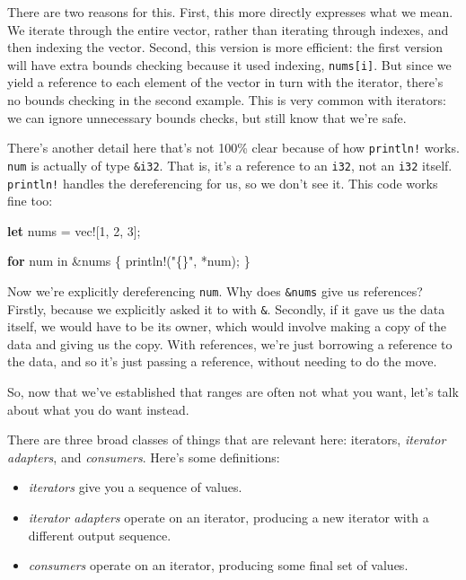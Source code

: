 \documentclass[a4paper,]{book}
\newenvironment{Shaded}{\begin{snugshade}}{\end{snugshade}}
\newcommand{\KeywordTok}[1]{\textcolor[rgb]{0.13,0.29,0.53}{\textbf{{#1}}}}
\newcommand{\DecValTok}[1]{\textcolor[rgb]{0.00,0.00,0.81}{{#1}}}
\newcommand{\StringTok}[1]{\textcolor[rgb]{0.31,0.60,0.02}{{#1}}}
\newcommand{\OtherTok}[1]{\textcolor[rgb]{0.56,0.35,0.01}{{#1}}}
\newcommand{\NormalTok}[1]{{#1}}
\begin{document}
There are two reasons for this. First, this more directly expresses what
we mean. We iterate through the entire vector, rather than iterating
through indexes, and then indexing the vector. Second, this version is
more efficient: the first version will have extra bounds checking
because it used indexing, \texttt{nums{[}i{]}}. But since we yield a
reference to each element of the vector in turn with the iterator,
there's no bounds checking in the second example. This is very common
with iterators: we can ignore unnecessary bounds checks, but still know
that we're safe.

There's another detail here that's not 100\% clear because of how
\texttt{println!} works. \texttt{num} is actually of type
\texttt{\&i32}. That is, it's a reference to an \texttt{i32}, not an
\texttt{i32} itself. \texttt{println!} handles the dereferencing for us,
so we don't see it. This code works fine too:

\begin{Shaded}
\begin{Highlighting}[]
\KeywordTok{let} \NormalTok{nums = }\OtherTok{vec!}\NormalTok{[}\DecValTok{1}\NormalTok{, }\DecValTok{2}\NormalTok{, }\DecValTok{3}\NormalTok{];}

\KeywordTok{for} \NormalTok{num in &nums \{}
    \OtherTok{println!}\NormalTok{(}\StringTok{"\{\}"}\NormalTok{, *num);}
\NormalTok{\}}
\end{Highlighting}
\end{Shaded}

Now we're explicitly dereferencing \texttt{num}. Why does
\texttt{\&nums} give us references? Firstly, because we explicitly asked
it to with \texttt{\&}. Secondly, if it gave us the data itself, we
would have to be its owner, which would involve making a copy of the
data and giving us the copy. With references, we're just borrowing a
reference to the data, and so it's just passing a reference, without
needing to do the move.

So, now that we've established that ranges are often not what you want,
let's talk about what you do want instead.

There are three broad classes of things that are relevant here:
iterators, \emph{iterator adapters}, and \emph{consumers}. Here's some
definitions:

\begin{itemize}
\itemsep1pt\parskip0pt
\item
  \emph{iterators} give you a sequence of values.
\item
  \emph{iterator adapters} operate on an iterator, producing a new
  iterator with a different output sequence.
\item
  \emph{consumers} operate on an iterator, producing some final set of
  values.
\end{itemize}
\end{document}
